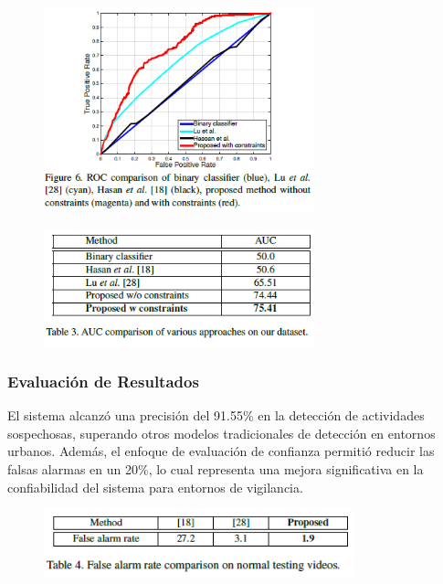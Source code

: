 \documentclass[listof=nochaptergap,12pt,times,authoryear]{report}
\begin{document}
\begin{figure}[h] %
    \centering
    \includegraphics[width=0.7\textwidth]{ent5.2.png} %
    \label{fig:ejemplo} %
\end{figure}

\begin{figure}[h] %
    \centering
    \includegraphics[width=0.7\textwidth]{ent5.3.png} %
    \label{fig:ejemplo} %
\end{figure}

\clearpage


\subsubsection{Evaluación de Resultados}
El sistema alcanzó una precisión del 91.55\% en la detección de actividades sospechosas, superando otros modelos tradicionales de detección en entornos urbanos. Además, el enfoque de evaluación de confianza permitió reducir las falsas alarmas en un 20\%, lo cual representa una mejora significativa en la confiabilidad del sistema para entornos de vigilancia.

\begin{figure}[h] %
    \centering
    \includegraphics[width=0.8\textwidth]{eva5.png} %
    \label{fig:ejemplo} %
\end{figure}
\end{document}
